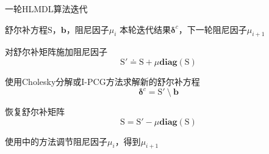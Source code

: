 \begin{algorithm}[htb!]
\caption{一轮HLMDL算法迭代}
\begin{algorithmic}
    \Require 舒尔补方程$\mathrm{S}$，$\bm{b}$，阻尼因子$\mu_i$
    \Ensure 本轮迭代结果$\bm{\delta}^c$，下一轮阻尼因子$\mu_{i+1}$

    \State 对舒尔补矩阵施加阻尼因子
    \[
        \mathrm{S}' \doteq \mathrm{S}+\mu\mathbf{diag}(\mathrm{S})
    \]

    \State 使用Cholesky分解或I-PCG方法求解新的舒尔补方程
    \[
        \bm{\delta}^c = \mathrm{S}' \:\setminus\: \bm{b}
    \]

    \State 恢复舒尔补矩阵
    \[
        \mathrm{S} = \mathrm{S}'-\mu\mathbf{diag}(\mathrm{S})
    \]

    \State 使用中的方法调节阻尼因子$\mu_i$，得到$\mu_{i+1}$
\end{algorithmic}
\label{alg:hlmdl}
\end{algorithm}
